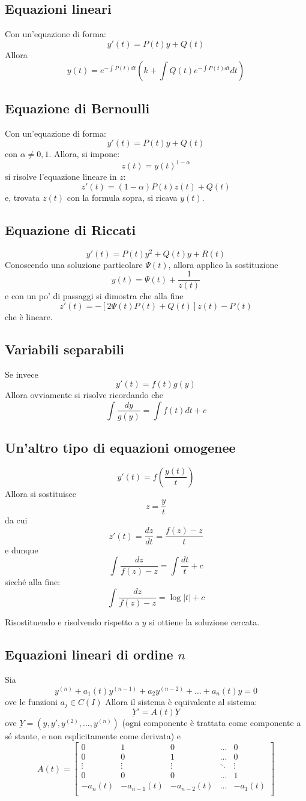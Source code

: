 \documentclass[a4paper,12pt]{article}
\begin{document}
\subsection{Equazioni lineari}
Con un'equazione di forma:
$$y'(t) = P(t)y+Q(t)$$
Allora
$$y(t)=e^{- \displaystyle\int P(t)dt}\left(k + \int Q(t)e^{-\displaystyle\int P(t)dt}dt\right)$$
\subsection{Equazione di Bernoulli}
Con un'equazione di forma:
$$y'(t) = P(t)y+Q(t)$$
con $\alpha \neq 0, 1$. Allora, si impone:
$$ z(t)=y(t)^{1-\alpha} $$
si risolve l'equazione lineare in $z$: $$z'(t)=(1-\alpha)P(t)z(t)+Q(t)$$ e, trovata $z(t)$ con la formula sopra, si ricava $y(t)$.

\subsection{Equazione di Riccati}
$$y'(t) = P(t)y^2+Q(t)y+R(t)$$
Conoscendo una soluzione particolare $\Psi(t)$, allora applico la sostituzione
$$y(t)=\Psi(t)+\dfrac{1}{z(t)}$$
e con un po' di passaggi si dimostra che alla fine
$$z'(t)= -\left[2\Psi(t)P(t)+Q(t)\right]z(t)-P(t)$$
che è lineare.
\subsection{Variabili separabili}
Se invece
$$y'(t) = f(t)g(y)$$
Allora ovviamente si risolve ricordando che
$$\int\dfrac{dy}{g(y)}=\int f(t)dt + c$$
\subsection{Un'altro tipo di equazioni omogenee}
$$y'(t) = f\left(\dfrac{y(t)}{t}\right)$$
Allora si sostituisce
$$z=\dfrac{y}{t}$$
da cui $$z'(t) = \dfrac{dz}{dt} = \dfrac{f(z)-z}{t}$$
e dunque
$$\int\dfrac{dz}{f(z)-z}=\int \dfrac{dt}{t} + c$$
sicché alla fine:
$$\int\dfrac{dz}{f(z)-z} = \log|t| + c$$

Risostituendo e risolvendo rispetto a $y$ si ottiene la soluzione cercata.

\subsection{Equazioni lineari di ordine $n$}
Sia
$$y^{(n)} + a_1(t)y^{(n-1)} + a_2y^{(n-2)} + ... + a_n(t)y = 0$$
ove le funzioni $a_j \in C(I)$
Allora il sistema è equivalente al sistema:
$$\underbar{Y}' = A(t)\underbar{Y}$$
ove $\underbar{Y}=(y, y', y^{(2)}, ..., y^{(n)})$ (ogni componente è trattata come componente a sé stante, e non esplicitamente come derivata) e
$$A(t) =
\begin{bmatrix}
0 & 1 & 0 & ... & 0\\
0 & 0 & 1 & ... & 0\\
\vdots & \vdots & \vdots & \ddots & \vdots \\
0 & 0 & 0 & ... & 1 \\
-a_n(t) & -a_{n-1}(t) & -a_{n-2}(t) & ... & -a_{1}(t) \\
\end{bmatrix}
$$
\end{document}
